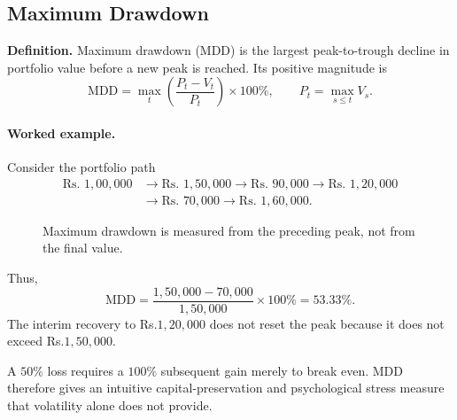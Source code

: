 \documentclass[12pt,openany]{book}
\theoremstyle{definition}
\theoremstyle{remark}
\begin{document}
\subsection{Maximum Drawdown}

\textbf{Definition.} Maximum drawdown (MDD) is the largest peak-to-trough
decline in portfolio value before a new peak is reached. Its positive
magnitude is
\[
\text{MDD}
 =\max_t\left(\frac{P_t-V_t}{P_t}\right)\times100\%,
\qquad
P_t=\max_{s\leq t}V_s.
\]

\paragraph{Worked example.}
Consider the portfolio path
\[
\begin{aligned}
\text{Rs. }1{,}00{,}000
&\rightarrow \text{Rs. }1{,}50{,}000
\rightarrow \text{Rs. }90{,}000
\rightarrow \text{Rs. }1{,}20{,}000 \\
&\rightarrow \text{Rs. }70{,}000
\rightarrow \text{Rs. }1{,}60{,}000.
\end{aligned}
\]

\begin{figure}[H]
\centering
{}
\caption{Maximum drawdown is measured from the preceding peak, not from the final value.}
\label{fig:maximum-drawdown}
\end{figure}

Thus,
\[
\text{MDD}
 =\frac{1{,}50{,}000-70{,}000}{1{,}50{,}000}\times100\%
 =\mathbf{53.33\%}.
\]
The interim recovery to Rs.\(1{,}20{,}000\) does not reset the peak because
it does not exceed Rs.\(1{,}50{,}000\).

A \(50\%\) loss requires a \(100\%\) subsequent gain merely to break even.
MDD therefore gives an intuitive capital-preservation and psychological
stress measure that volatility alone does not provide.
\end{document}
